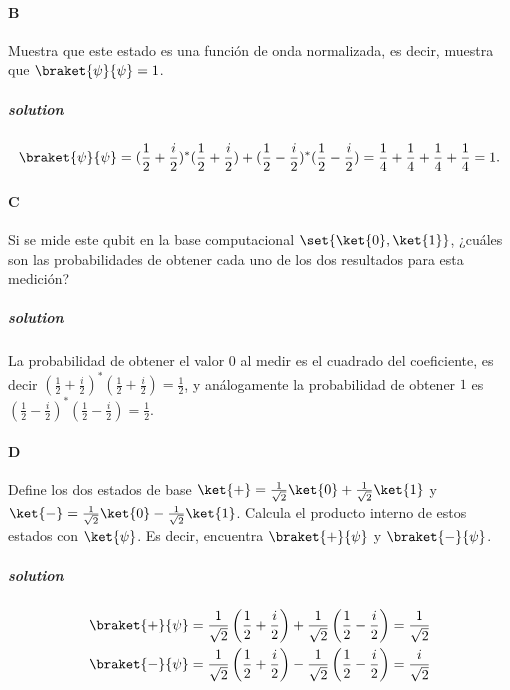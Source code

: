 \paragraph{B} Muestra que este estado es una función de onda normalizada, es decir, muestra que $\braket{\psi}{\psi}= 1$.
\subparagraph{solution}
	\[
		\braket{\psi}{\psi} = (\frac{1}{2}+\frac{i}{2})^* (\frac{1}{2}+\frac{i}{2}) + (\frac{1}{2}-\frac{i}{2})^* (\frac{1}{2}-\frac{i}{2})=\frac{1}{4}+\frac{1}{4}+\frac{1}{4}+\frac{1}{4}=1.
		\]

\paragraph{C} Si se mide este qubit en la base computacional $\set{\ket{0}, \ket{1}}$, ¿cuáles son las
probabilidades de obtener cada uno de los dos resultados para esta medición?
\subparagraph{solution}
	La probabilidad de obtener el valor $0$ al medir es el cuadrado del coeficiente, es decir $(\frac{1}{2}+\frac{i}{2})^* (\frac{1}{2}+\frac{i}{2})=\frac{1}{2}$, y análogamente la probabilidad de obtener $1$ es $(\frac{1}{2}-\frac{i}{2})^* (\frac{1}{2}-\frac{i}{2})=\frac{1}{2}$.


\paragraph{D} Define los dos estados de base $\ket{+}=\frac{1}{\sqrt{2}}\ket{0}+\frac{1}{\sqrt{2}}\ket{1}$ y $\ket{-}=\frac{1}{\sqrt{2}}\ket{0}-\frac{1}{\sqrt{2}}\ket{1}$.
Calcula el producto interno de estos estados con $\ket{\psi}$.
Es decir, encuentra $\braket{+}{\psi}$ y $\braket{-}{\psi}$.
\subparagraph{solution}
	\begin{equation*}
		\begin{split}
			\braket{+}{\psi} &= \frac{1}{\sqrt{2}}\left(\frac{1}{2}+\frac{i}{2}\right)+\frac{1}{\sqrt{2}}\left(\frac{1}{2}-\frac{i}{2}\right)= \frac{1}{\sqrt{2}}\\
			\braket{-}{\psi} &= \frac{1}{\sqrt{2}}\left(\frac{1}{2}+\frac{i}{2}\right)-\frac{1}{\sqrt{2}}\left(\frac{1}{2}-\frac{i}{2}\right)= \frac{i}{\sqrt{2}}\\
		\end{split}
	\end{equation*}


